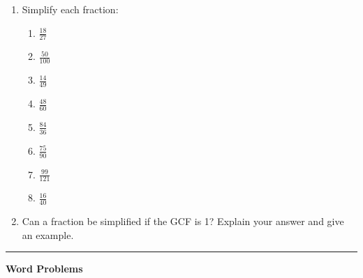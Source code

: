 \documentclass[
  letterpaper,
  DIV=11,
  numbers=noendperiod]{scrreprt}
\providecommand{\tightlist}{%
  \setlength{\itemsep}{0pt}\setlength{\parskip}{0pt}}
\begin{document}
\begin{enumerate}
\def\labelenumi{\arabic{enumi}.}
\setcounter{enumi}{3}
\item
  Simplify each fraction:

  \begin{enumerate}
  \def\labelenumii{\alph{enumii}.}
  \tightlist
  \item
    \(\frac{18}{27}\)
  \item
    \(\frac{50}{100}\)
  \item
    \(\frac{14}{49}\)
  \item
    \(\frac{48}{60}\)
  \item
    \(\frac{84}{36}\)
  \item
    \(\frac{75}{90}\)
  \item
    \(\frac{99}{121}\)
  \item
    \(\frac{16}{40}\)
  \end{enumerate}
\item
  Can a fraction be simplified if the GCF is 1? Explain your answer and
  give an example.
\end{enumerate}

\begin{center}\rule{0.5\linewidth}{0.5pt}\end{center}

\textbf{Word Problems}
\end{document}
